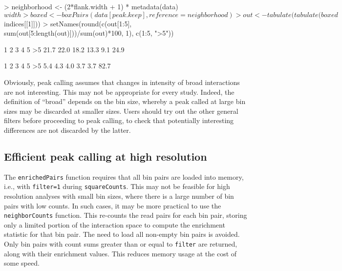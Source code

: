 \documentclass[12pt]{report}
\renewenvironment{Schunk}{\vspace{0pt}}{\vspace{0pt}}
\newcommand{\code}[1]{{\small\texttt{#1}}}
\begin{document}
\begin{Schunk}
\begin{Sinput}
> neighborhood <- (2*flank.width + 1) * metadata(data)$width
> boxed <- boxPairs(data[peak.keep], reference=neighborhood)
> out <- tabulate(tabulate(boxed$indices[[1]]))
> setNames(round(c(out[1:5], sum(out[5:length(out)]))/sum(out)*100, 1), c(1:5, ">5"))
\end{Sinput}
\begin{Soutput}
   1    2    3    4    5   >5 
21.7 22.0 18.2 13.3  9.1 24.9 
\end{Soutput}
\begin{Soutput}
   1    2    3    4    5   >5 
 5.4  4.3  4.0  3.7  3.7 82.7 
\end{Soutput}
\end{Schunk}

Obviously, peak calling assumes that changes in intensity of broad interactions are not interesting.
This may not be appropriate for every study.
Indeed, the definition of ``broad'' depends on the bin size, whereby a peak called at large bin sizes may be discarded at smaller sizes.
Users should try out the other general filters before proceeding to peak calling, to check that potentially interesting differences are not discarded by the latter.


\subsection{Efficient peak calling at high resolution}
The \code{enrichedPairs} function requires that all bin pairs are loaded into memory, i.e., with \code{filter=1} during \code{squareCounts}.
This may not be feasible for high resolution analyses with small bin sizes, where there is a large number of bin pairs with low counts.
In such cases, it may be more practical to use the \code{neighborCounts} function.
This re-counts the read pairs for each bin pair, storing only a limited portion of the interaction space to compute the enrichment statistic for that bin pair.
The need to load all non-empty bin pairs is avoided.
Only bin pairs with count sums greater than or equal to \code{filter} are returned, along with their enrichment values.
This reduces memory usage at the cost of some speed.
\end{document}

